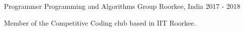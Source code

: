 \begin{cventries}
  \cventry
    {Programmer} %
    {Programming and Algorithms Group} %
    {Roorkee, India} %
    {2017 - 2018} %
    {
      \begin{cvitems} %
        \item {Member of the Competitive Coding club based in IIT Roorkee.}
      \end{cvitems}
    }

\end{cventries}
